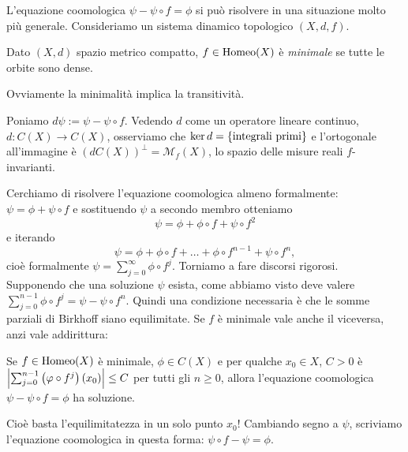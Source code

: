 L'equazione coomologica $\psi-\psi\circ f=\phi$ si può risolvere in una situazione molto più generale.
Consideriamo un sistema dinamico topologico $(X,d,f)$.

\begin{defi}Dato $(X,d)$ spazio metrico compatto, $f\in\operatorname{Homeo}(X)$ è \emph{minimale} se tutte le orbite sono dense.
\end{defi}

\begin{oss}Ovviamente la minimalità implica la transitività.
\end{oss}

Poniamo $d\psi:=\psi-\psi\circ f$. Vedendo $d$ come un operatore lineare continuo,
$d:C(X)\to C(X)$, osserviamo che $\ker d=\left\{\text{integrali primi}\right\}$ e l'ortogonale all'immagine è $(dC(X))^\perp
=\mathcal{M}_f(X)$, lo spazio delle misure reali $f$-invarianti.

Cerchiamo di risolvere l'equazione coomologica almeno formalmente:
$\psi=\phi+\psi\circ f$ e sostituendo $\psi$ a secondo membro otteniamo
\[ \psi=\phi+\phi\circ f+\psi\circ f^2 \]
e iterando
\[ \psi=\phi+\phi\circ f+\dots+\phi\circ f^{n-1}+\psi\circ f^n, \]
cioè formalmente $\psi=\sum_{j=0}^\infty \phi\circ f^j$. Torniamo a fare discorsi rigorosi. \\
Supponendo che una soluzione $\psi$ esista, come abbiamo visto deve valere
$\sum_{j=0}^{n-1}\phi\circ f^j=\psi-\psi\circ f^n$. Quindi una condizione necessaria è che le somme parziali
di Birkhoff siano equilimitate. Se $f$ è minimale vale anche il viceversa, anzi vale addirittura:
\begin{teo}Se $f\in\operatorname{Homeo}(X)$ è minimale, $\phi\in C(X)$ e per qualche $x_0\in X$, $C>0$
è $\left|\sum_{j=0}^{n-1}\left(\varphi\circ f^j\right)(x_0)\right|\le C$ per tutti gli $n\ge 0$, allora l'equazione coomologica
$\psi-\psi\circ f=\phi$ ha soluzione.
\end{teo}

Cioè basta l'equilimitatezza in un solo punto $x_0$! Cambiando segno a $\psi$, scriviamo l'equazione coomologica
in questa forma: $\psi\circ f-\psi=\phi$.

